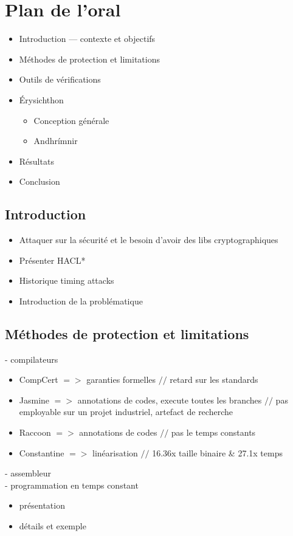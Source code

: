 \documentclass[10pt,a5paper]{article}
\begin{document}
\section*{Plan de l'oral}

\begin{itemize}
  \item Introduction — contexte et objectifs
  \item Méthodes de protection et limitations
  \item Outils de vérifications
  \item Érysichthon
  \begin{itemize}
    \item Conception générale
    \item Andhrímnir
  \end{itemize}
  \item Résultats
  \item Conclusion
\end{itemize}

\subsection*{Introduction}
\begin{multicols}{2}
  \begin{itemize}
    \item Attaquer sur la sécurité et le besoin d'avoir des libs cryptographiques
    \item Présenter HACL*
    \item Historique timing attacks
    \item Introduction de la problématique
  \end{itemize}
\end{multicols}

\subsection*{Méthodes de protection et limitations}
- compilateurs
\begin{multicols}{2}
\begin{itemize}
  \item CompCert $=>$ garanties formelles $//$ retard sur les standards
  \item Jasmine $=>$ annotations de codes, execute toutes les branches $//$ pas employable sur un projet industriel, artefact de recherche
  \item Raccoon $=>$ annotations de codes $//$ pas le temps constants
  \item Constantine $=>$ linéarisation $//$ 16.36x taille binaire \& 27.1x temps
\end{itemize}
\end{multicols}
- assembleur\\
- programmation en temps constant 
\begin{itemize}
  \item présentation
  \item détails et exemple
\end{itemize}
\end{document}
